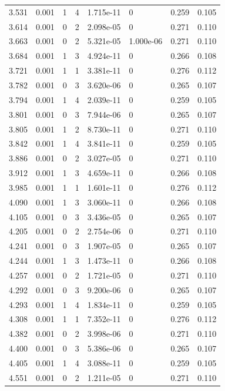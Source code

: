 \documentclass[preview]{standalone}
\begin{document}
{{{\begin{tabular}{L{1.2cm}C{1.2cm} C{0.3cm}C{0.5cm} C{1.4cm}C{1.4cm} C{1.4cm}C{1.4cm}}
  3.531  &  0.001  & 1     &  4 &  1.715e-11  & 0  & 0.259 &  0.105   \\ 
  3.614  &  0.001  & 0     &  2 &  2.098e-05  & 0  & 0.271 &  0.110   \\ 
  3.663  &  0.001  & 0     &  2 &  5.321e-05  & 1.000e-06  & 0.271 &  0.110   \\ 
  3.684  &  0.001  & 1     &  3 &  4.924e-11  & 0  & 0.266 &  0.108   \\ 
  3.721  &  0.001  & 1     &  1 &  3.381e-11  & 0  & 0.276 &  0.112   \\ 
  3.782  &  0.001  & 0     &  3 &  3.620e-06  & 0  & 0.265 &  0.107   \\ 
  3.794  &  0.001  & 1     &  4 &  2.039e-11  & 0  & 0.259 &  0.105   \\ 
  3.801  &  0.001  & 0     &  3 &  7.944e-06  & 0  & 0.265 &  0.107   \\ 
  3.805  &  0.001  & 1     &  2 &  8.730e-11  & 0  & 0.271 &  0.110   \\ 
  3.842  &  0.001  & 1     &  4 &  3.841e-11  & 0  & 0.259 &  0.105   \\ 
  3.886  &  0.001  & 0     &  2 &  3.027e-05  & 0  & 0.271 &  0.110   \\ 
  3.912  &  0.001  & 1     &  3 &  4.659e-11  & 0  & 0.266 &  0.108   \\ 
  3.985  &  0.001  & 1     &  1 &  1.601e-11  & 0  & 0.276 &  0.112   \\ 
  4.090  &  0.001  & 1     &  3 &  3.060e-11  & 0  & 0.266 &  0.108   \\ 
  4.105  &  0.001  & 0     &  3 &  3.436e-05  & 0  & 0.265 &  0.107   \\ 
  4.205  &  0.001  & 0     &  2 &  2.754e-06  & 0  & 0.271 &  0.110   \\ 
  4.241  &  0.001  & 0     &  3 &  1.907e-05  & 0  & 0.265 &  0.107   \\ 
  4.244  &  0.001  & 1     &  3 &  1.473e-11  & 0  & 0.266 &  0.108   \\ 
  4.257  &  0.001  & 0     &  2 &  1.721e-05  & 0  & 0.271 &  0.110   \\ 
  4.292  &  0.001  & 0     &  3 &  9.200e-06  & 0  & 0.265 &  0.107   \\ 
  4.293  &  0.001  & 1     &  4 &  1.834e-11  & 0  & 0.259 &  0.105   \\ 
  4.308  &  0.001  & 1     &  1 &  7.352e-11  & 0  & 0.276 &  0.112   \\ 
  4.382  &  0.001  & 0     &  2 &  3.998e-06  & 0  & 0.271 &  0.110   \\ 
  4.400  &  0.001  & 0     &  3 &  5.386e-06  & 0  & 0.265 &  0.107   \\ 
  4.405  &  0.001  & 1     &  4 &  3.088e-11  & 0  & 0.259 &  0.105   \\ 
  4.551  &  0.001  & 0     &  2 &  1.211e-05  & 0  & 0.271 &  0.110   \\ 
\hline 
\end{tabular} 

}}}
\end{document}
